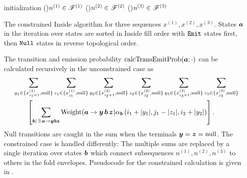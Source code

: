 \documentclass[10pt]{article}
\begin{document}
\begin{algorithm}[!ht]

  \SetLine

  initialization\;
  \ForEach(){$n^{(1)} \in \foldenv^{(1)}$} {
    \ForEach(){$n^{(2)} \in \foldenv^{(2)}$} {
      \ForEach(){$n^{(3)} \in \foldenv^{(3)}$} {
        \BlankLine
        \BlankLine
      }
    }
  }
  \;
  
  \caption{
    The constrained Inside algorithm for three sequences $x^{(1)},x^{(2)},x^{(3)}$.
    States $\bvec{a}$ in the iteration over states are sorted in Inside fill order
    with $\Semit$ states first, then $\Snull$ states in reverse topological order.
  }
\end{algorithm}

The transition and emission probability $\mathrm{calcTransEmitProb}(\bvec{a}; \cdot)$ can be calculated recursively 
in the unconstrained case as
\begin{align} \label{eqn:insidetransemit}
  & \sum_{y_1\in\{x^{(1)}_{i_1+1},\Tnull\}}\sum_{z_1\in\{x^{(1)}_{j_1},\Tnull\}} \sum_{y_2\in\{x^{(2)}_{i_2+1},\Tnull\}}\sum_{z_2\in\{x^{(2)}_{j_2},\Tnull\}} \sum_{y_3\in\{x^{(3)}_{i_3+1},\Tnull\}}\sum_{z_3\in\{x^{(3)}_{j_3},\Tnull\}} \nonumber \\
  &\qquad \left[ \sum_{\bvec{b}|\,\exists\, \bvec{a}\to\bvec{y}\bvec{b}\bvec{z}} \weight (\bvec{a}\to\bvec{y}\,\bvec{b}\,\bvec{z}) \inside{\bvec{b}}{i_1+|y_1|}{j_1-|z_1|}{i_2+|y_2|}{j_2-|z_2|}{i_3+|y_3|}{j_3-|z_3|} \right] . \nonumber
\end{align}
Null transitions are caught in the sum when the terminals $\bvec{y} = \bvec{z} = \Tnull$.
The constrained case is handled differently: The multiple sums are replaced by a single iteration over states $\bvec{b}$
which connect subsequences $n^{(1)}, n^{(2)}, n^{(3)}$ to others in the fold envelopes.
Pseudocode for the constrained calculation is given in .
\end{document}
